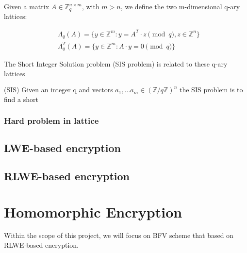 \documentclass[A4paper,12pt]{article}
\begin{document}
\begin{definition} Given a matrix $A \in \mathbb{Z}_q^{n \times m}$, with $m > n$, we define the two m-dimensional q-ary lattices:
\end{definition}
\begin{equation*}
\begin{aligned}
	&\Lambda_q(A) = \{ y \in \mathbb{Z}^m : y = A^T \cdot z \pmod q, z \in \mathbb{Z}^n\}\\
	&\Lambda_q^T(A) = \{ y \in \mathbb{Z}^m : A \cdot y = 0 \pmod q \}
\end{aligned}
\end{equation*}

The Short Integer Solution problem (SIS problem) is related to these q-ary lattices
\begin{definition} (SIS) Given an integer q and vectors $a_1,...a_m \in (\mathbb{Z}/q\mathbb{Z})^n$ the SIS problem is to find a short \end{definition}

\subsubsection{Hard problem in lattice}
\subsection{LWE-based encryption}
\subsection{RLWE-based encryption}
\newpage

\section{Homomorphic Encryption}
Within the scope of this project, we will focus on BFV scheme that based on RLWE-based encryption.
\end{document}
